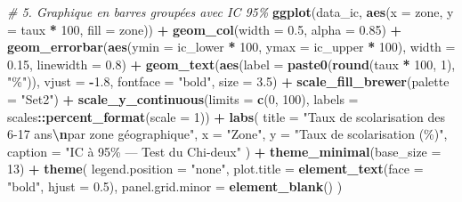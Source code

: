 \documentclass[
]{article}
\newenvironment{Shaded}{\begin{snugshade}}{\end{snugshade}}
\newcommand{\AttributeTok}[1]{\textcolor[rgb]{0.13,0.29,0.53}{#1}}
\newcommand{\CommentTok}[1]{\textcolor[rgb]{0.56,0.35,0.01}{\textit{#1}}}
\newcommand{\DecValTok}[1]{\textcolor[rgb]{0.00,0.00,0.81}{#1}}
\newcommand{\FloatTok}[1]{\textcolor[rgb]{0.00,0.00,0.81}{#1}}
\newcommand{\FunctionTok}[1]{\textcolor[rgb]{0.13,0.29,0.53}{\textbf{#1}}}
\newcommand{\NormalTok}[1]{#1}
\newcommand{\SpecialCharTok}[1]{\textcolor[rgb]{0.81,0.36,0.00}{\textbf{#1}}}
\newcommand{\StringTok}[1]{\textcolor[rgb]{0.31,0.60,0.02}{#1}}
\begin{document}
\begin{Shaded}
\begin{Highlighting}[]
\CommentTok{\# 5. Graphique en barres groupées avec IC 95\%}
\FunctionTok{ggplot}\NormalTok{(data\_ic, }\FunctionTok{aes}\NormalTok{(}\AttributeTok{x =}\NormalTok{ zone, }\AttributeTok{y =}\NormalTok{ taux }\SpecialCharTok{*} \DecValTok{100}\NormalTok{, }\AttributeTok{fill =}\NormalTok{ zone)) }\SpecialCharTok{+}
  \FunctionTok{geom\_col}\NormalTok{(}\AttributeTok{width =} \FloatTok{0.5}\NormalTok{, }\AttributeTok{alpha =} \FloatTok{0.85}\NormalTok{) }\SpecialCharTok{+}
  \FunctionTok{geom\_errorbar}\NormalTok{(}\FunctionTok{aes}\NormalTok{(}\AttributeTok{ymin =}\NormalTok{ ic\_lower }\SpecialCharTok{*} \DecValTok{100}\NormalTok{, }\AttributeTok{ymax =}\NormalTok{ ic\_upper }\SpecialCharTok{*} \DecValTok{100}\NormalTok{),}
                \AttributeTok{width =} \FloatTok{0.15}\NormalTok{, }\AttributeTok{linewidth =} \FloatTok{0.8}\NormalTok{) }\SpecialCharTok{+}
  \FunctionTok{geom\_text}\NormalTok{(}\FunctionTok{aes}\NormalTok{(}\AttributeTok{label =} \FunctionTok{paste0}\NormalTok{(}\FunctionTok{round}\NormalTok{(taux }\SpecialCharTok{*} \DecValTok{100}\NormalTok{, }\DecValTok{1}\NormalTok{), }\StringTok{"\%"}\NormalTok{)),}
            \AttributeTok{vjust =} \SpecialCharTok{{-}}\FloatTok{1.8}\NormalTok{, }\AttributeTok{fontface =} \StringTok{"bold"}\NormalTok{, }\AttributeTok{size =} \FloatTok{3.5}\NormalTok{) }\SpecialCharTok{+}
  \FunctionTok{scale\_fill\_brewer}\NormalTok{(}\AttributeTok{palette =} \StringTok{"Set2"}\NormalTok{) }\SpecialCharTok{+}
  \FunctionTok{scale\_y\_continuous}\NormalTok{(}\AttributeTok{limits =} \FunctionTok{c}\NormalTok{(}\DecValTok{0}\NormalTok{, }\DecValTok{100}\NormalTok{),}
                     \AttributeTok{labels =}\NormalTok{ scales}\SpecialCharTok{::}\FunctionTok{percent\_format}\NormalTok{(}\AttributeTok{scale =} \DecValTok{1}\NormalTok{)) }\SpecialCharTok{+}
  \FunctionTok{labs}\NormalTok{(}
    \AttributeTok{title    =} \StringTok{"Taux de scolarisation des 6{-}17 ans}\SpecialCharTok{\textbackslash{}n}\StringTok{par zone géographique"}\NormalTok{,}
    \AttributeTok{x        =} \StringTok{"Zone"}\NormalTok{,}
    \AttributeTok{y        =} \StringTok{"Taux de scolarisation (\%)"}\NormalTok{,}
    \AttributeTok{caption  =} \StringTok{"IC à 95\% — Test du Chi{-}deux"}
\NormalTok{  ) }\SpecialCharTok{+}
  \FunctionTok{theme\_minimal}\NormalTok{(}\AttributeTok{base\_size =} \DecValTok{13}\NormalTok{) }\SpecialCharTok{+}
  \FunctionTok{theme}\NormalTok{(}
    \AttributeTok{legend.position  =} \StringTok{"none"}\NormalTok{,}
    \AttributeTok{plot.title       =} \FunctionTok{element\_text}\NormalTok{(}\AttributeTok{face =} \StringTok{"bold"}\NormalTok{, }\AttributeTok{hjust =} \FloatTok{0.5}\NormalTok{),}
    \AttributeTok{panel.grid.minor =} \FunctionTok{element\_blank}\NormalTok{()}
\NormalTok{  )}
\end{Highlighting}
\end{Shaded}
\end{document}
